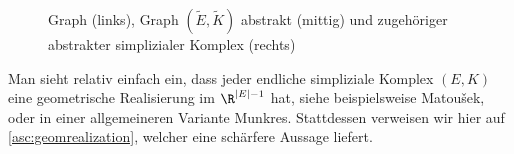 \begin{figure}
    \centering
    \caption{Graph (links), Graph $(\tilde E,\tilde K)$ abstrakt (mittig) 
        und zugehöriger abstrakter simplizialer Komplex (rechts)}
    \label{asc:fig:graphtocomplex}
\end{figure}

Man sieht relativ einfach ein, dass jeder endliche simpliziale Komplex $(E,K)$ 
eine geometrische Realisierung im $\R^{\abs{E}-1}$ hat, siehe beispielsweise
Matou\v sek\cite[Ch.\,1,]{bookc:matousek03}, oder in einer allgemeineren
Variante Munkres\cite[Ch.\,1,\;\S3,]{bookc:munkres84}. Stattdessen
verweisen wir hier auf \cref{asc:geomrealization}, welcher eine schärfere Aussage
liefert.


